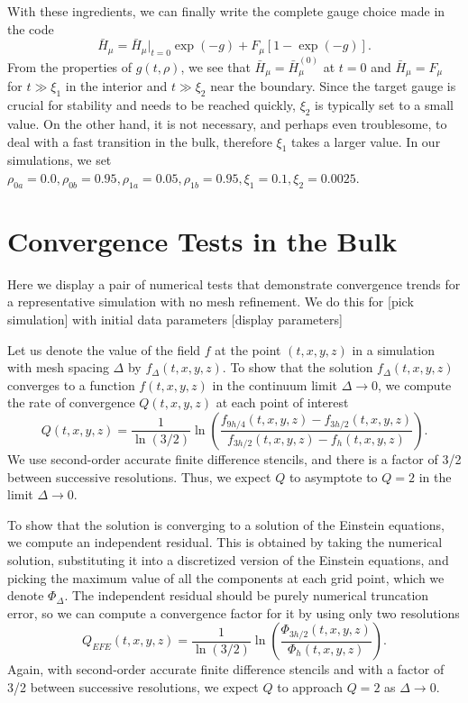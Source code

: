 \documentclass[a4paper,11pt]{article}
\numberwithin{equation}{section}
\begin{document}
With these ingredients, we can finally write the complete gauge choice made in the code
\begin{equation}
\bar{H}_\mu=\bar{H}_{\mu}|_{t=0}\exp(-g)+F_\mu[1- \exp(-g)].
\end{equation}
From the properties of $g(t,\rho)$, we see that $\bar{H}_\mu=\bar{H}_{\mu}^{(0)}$ at $t=0$ and $\bar{H}_\mu=F_\mu$ for $t\gg\xi_1$ in the interior and $t\gg\xi_2$ near the boundary. Since the target gauge is crucial for stability and needs to be reached quickly, $\xi_2$ is typically set to a small value. On the other hand, it is not necessary, and perhaps even troublesome, to deal with a fast transition in the bulk, therefore $\xi_1$ takes a larger value. In our simulations, we set $\rho_{0a}=0.0,\rho_{0b}=0.95,\rho_{1a}=0.05,\rho_{1b}=0.95,\xi_1=0.1,\xi_2=0.0025$.

\section{Convergence Tests in the Bulk}\label{sec:convbulk}

Here we display a pair of numerical tests that demonstrate convergence trends for a representative simulation with no mesh refinement.
We do this for [pick simulation] with initial data parameters [display parameters]

Let us denote the value of the field $f$ at the point $(t,x,y,z)$ in a simulation with mesh spacing $\Delta$ by $f_\Delta(t,x,y,z)$.
To show that the solution $f_\Delta(t,x,y,z)$ converges to a function $f(t,x,y,z)$ in the continuum limit $\Delta\rightarrow0$, we compute the rate of convergence $Q(t,x,y,z)$ at each point of interest
\begin{equation}\label{eq:qconv}
Q(t,x,y,z)=\frac{1}{\ln(3/2)}\ln\left( \frac{f_{9h/4}(t,x,y,z)-f_{3h/2}(t,x,y,z)}{f_{3h/2}(t,x,y,z)-f_{h}(t,x,y,z)} \right).
\end{equation}
We use second-order accurate finite difference stencils, and there is a factor of 3/2 between successive resolutions.
Thus, we expect $Q$ to asymptote to $Q=2$ in the limit $\Delta\rightarrow0$.

To show that the solution is converging to a solution of the Einstein equations, we compute an independent residual. 
This is obtained by taking the numerical solution, substituting it into a discretized version of
the Einstein equations, and picking the maximum value of all the components at each grid point, which we denote $\Phi_\Delta$. 
The independent residual should be purely numerical truncation error, so we can compute a convergence factor for it by using only two resolutions
\begin{equation}\label{eq:qires}
Q_{EFE}(t,x,y,z)=\frac{1}{\ln(3/2)}\ln\left( \frac{\Phi_{3h/2}(t,x,y,z)}{\Phi_{h}(t,x,y,z)} \right).
\end{equation}
Again, with second-order accurate finite difference stencils and with a factor of 3/2 between successive resolutions, we expect $Q$ to approach $Q=2$ as $\Delta\rightarrow0$.
\end{document}
